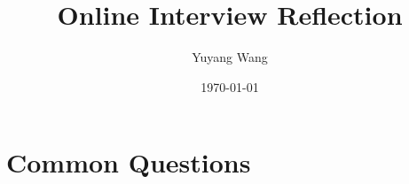 


\title{Online Interview Reflection}

\author{Yuyang Wang}
\date{\today}
\makeatletter
\fancyfoot[L]{\scshape \MakeLowercase{\@author}}
\fancyfoot[R]{{\scshape \MakeLowercase{\@title}}\quad{\LARGE\sfrac{\thepage}{\pageref*{LastPage}}}}
\makeatother



\maketitle%
\thispagestyle{fancy}

\section{Common Questions}


